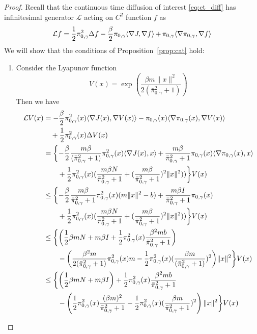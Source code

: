 \documentclass[journal,onecolumn]{IEEEtran}
\newcommand{\grad}{\nabla}
\newcommand{\rew}{J}
\newcommand{\dimn}{N}
\newcommand{\gen}{\mathcal{L}}
\newcommand{\ids}{\pi}
\newcommand{\idw}{\gamma}
\newcommand{\isp}{0,\idw}
\newcommand{\idistmaxw}{\bar{\ids}_{\isp}}
\newcommand{\idiffc}{I}
\newcommand{\dissm}{m}
\newcommand{\dissb}{b}
\newcommand{\idistrw}{\ids_{\isp}}
\newcommand{\larg}{x}
\begin{document}
{\begin{proof}
    Recall that the continuous time diffusion of interest \eqref{eq:ct_diff} has infinitesimal generator $\gen$ acting on $C^2$ function $f$ as 
    \[\gen f = \frac{1}{2}\idistrw^2 \Delta f - \frac{\beta}{2} \idistrw \langle \grad \rew , \grad f \rangle  \,\color{black}{+}\, \idistrw \langle  \grad \idistrw, \grad f\rangle\]
    We will show that the conditions of Proposition~\ref{prop:cat} hold:
    \begin{enumerate}
        \item Consider the Lyapunov function \[V(\larg) = \exp\left(\frac{\beta \dissm\|\larg\|^2 }{2(\idistmaxw^2+1)}\right)\]
        Then we have
        \begin{align}
        \begin{split}
        \label{eq:Lyapbound}
            \gen V(\larg) &= -\frac{\beta}{2} \idistrw^2(\larg) \langle \grad\rew(\larg),\grad V(\larg)\rangle - \idistrw(\larg) \langle \grad \idistrw(\larg), \grad V(\larg)\rangle \\&\quad+ \frac{1}{2}\idistrw^2(\larg) \Delta V (\larg)\\
            & = \biggl\{-\frac{\beta}{2} \frac{\dissm \beta}{(\idistmaxw^2+1)} \idistrw^2(\larg) \langle \grad \rew(\larg), \larg\rangle \,\color{black}{+}\, \frac{\dissm \beta}{\idistmaxw^2+1} \idistrw(\larg) \langle  \grad \idistrw(\larg), \larg \rangle \\
            & \quad \quad + \frac{1}{2}\idistrw^2(\larg)(\frac{\dissm \beta \dimn}{\idistmaxw^2+1} + (\frac{\dissm\beta}{\idistmaxw^2+1})^2\|\larg\|^2))\biggr\}V(\larg) \\
            & \leq \biggl\{-\frac{\beta}{2} \frac{\dissm \beta}{\idistmaxw^2+1}  \idistrw^2(\larg) (\dissm \|\larg\|^2 - \dissb) + \frac{\dissm \beta \idiffc}{\idistmaxw^2+1} \idistrw(\larg)  \\
            &\quad \quad + \frac{1}{2}\idistrw^2(\larg)(\frac{\dissm \beta \dimn}{\idistmaxw^2+1} + (\frac{\dissm\beta}{\idistmaxw^2+1})^2\|\larg\|^2))\biggr\}V(\larg)\\
            & \leq \biggl\{\biggl(\frac{1}{2} \beta \dissm \dimn +  \dissm \beta \idiffc + \frac{1}{2}\idistrw^2(\larg) \frac{\beta^2 \dissm \dissb}{\idistmaxw^2+1}\biggr) \\& \quad \quad - \biggl(\frac{\beta^2\dissm}{2(\idistmaxw^2+1)}\idistrw^2(\larg)\dissm - \frac{1}{2}\idistrw^2(\larg)(\frac{\beta \dissm}{(\idistmaxw^2+1)})^2 \biggr)\|\larg\|^2 \biggr\}V(\larg) \\
            & \leq \biggl\{\biggl(\frac{1}{2}\beta \dissm \dimn  + \dissm \beta \idiffc\biggr) + \frac{1}{2}\idistrw^2(\larg) \frac{\beta^2 \dissm \dissb}{\idistmaxw^2+1}\\& \quad \quad - \left(\frac{1}{2}\idistrw^2(\larg)\frac{(\beta \dissm)^2}{\idistmaxw^2+1} - \frac{1}{2}\idistrw^2(\larg)(\frac{\beta \dissm}{\idistmaxw^2+1})^2 \right)\|\larg\|^2 \biggr\}V(\larg) \\

\end{split}
\end{align}
\end{enumerate}
\end{proof}}
\end{document}
